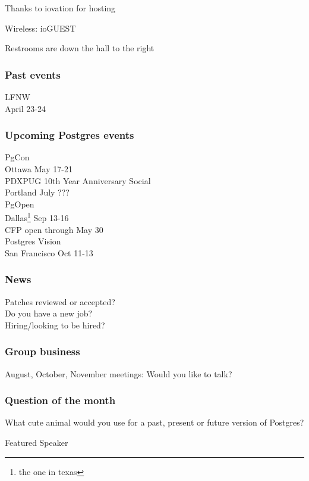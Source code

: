 \documentclass{beamer}
\begin{document}

\frame
{
  \begin{center}
  \item[]Thanks to iovation for hosting
  \item[]Wireless: ioGUEST
  \item[]Restrooms are down the hall to the right
  \end{center}
}

\frame
{
  \frametitle{Past events}
  \begin{center}
{\large LFNW\\} April 23-24\\
\vspace{5mm}
  \end{center}
}

\frame
{
  \frametitle{Upcoming Postgres events}
  \begin{center}
{\large PgCon\\}
Ottawa May 17-21\\
\vspace{5mm}
{\large PDXPUG 10th Year Anniversary Social\\}
Portland July ???\\
\vspace{5mm}
{\large PgOpen\\}
Dallas\footnote{the one in texas} Sep 13-16\\
CFP open through May 30\\
\vspace{5mm}
{\large Postgres Vision\\}
San Francisco Oct 11-13\\
  \end{center}
}

\frame
{
  \frametitle{News}
  \begin{center}
Patches reviewed or accepted?\\
Do you have a new job?\\
Hiring/looking to be hired?\\
  \end{center}
}

\frame
{
  \frametitle{Group business}
  \begin{center}
August, October, November meetings:  Would you like to talk?\\
  \end{center}
}

\frame
{
  \frametitle{Question of the month}
  \begin{center}
{\huge What cute animal would you use for a past, present or future
version of Postgres? }\\
  \end{center}
}

\frame
{
  \begin{center}
{\huge Featured Speaker}\\
  \end{center}
}
\end{document}
